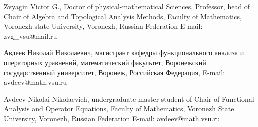 \documentclass[a4paper]{article} %
\begin{document}
Zvyagin Victor G., Doctor of physical-mathematical Sciences, Professor, head
of Chair of Algebra and
Topological Analysis Methods,
Faculty of Mathematics,
Voronezh state University, Voronezh, Russian
Federation
E-mail: zvg\_vsu@mail.ru


Авдеев Николай Николаевич,
магистрант кафедры функционального анализа и операторных уравнений,
математический факультет, Воронежский государственный университет,
Воронеж, Российская Федерация,
E-mail: avdeev@math.vsu.ru

Avdeev Nikolai Nikolaevich, undergraduate master student
of Chair of Functional Analysis and Operator Equations,
Faculty of Mathematics, Voronezh State
University, Voronezh, Russian Federation
E-mail: avdeev@math.vsu.ru
\end{document}
